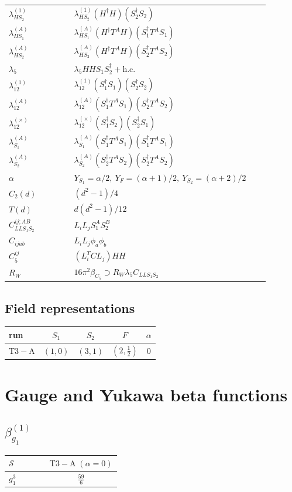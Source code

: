 \documentclass[9pt]{article}
\begin{document}
\begin{longtable}{@{}p{0.23\linewidth}p{0.69\linewidth}@{}}
$\lambda_{HS_2}^{(1)}$ & $\lambda_{HS_2}^{(1)}(H^\dagger H)(S_2^\dagger S_2)$ \\
$\lambda_{HS_1}^{(A)}$ & $\lambda_{HS_1}^{(A)}(H^\dagger T^AH)(S_1^\dagger T^AS_1)$ \\
$\lambda_{HS_2}^{(A)}$ & $\lambda_{HS_2}^{(A)}(H^\dagger T^AH)(S_2^\dagger T^AS_2)$ \\
$\lambda_5$ & $\lambda_5HHS_1S_2^\dagger+\mathrm{h.c.}$ \\
$\lambda_{12}^{(1)}$ & $\lambda_{12}^{(1)}(S_1^\dagger S_1)(S_2^\dagger S_2)$ \\
$\lambda_{12}^{(A)}$ & $\lambda_{12}^{(A)}(S_1^\dagger T^AS_1)(S_2^\dagger T^AS_2)$ \\
$\lambda_{12}^{(\times)}$ & $\lambda_{12}^{(\times)}(S_1^\dagger S_2)(S_2^\dagger S_1)$ \\
$\lambda_{S_1}^{(A)}$ & $\lambda_{S_1}^{(A)}(S_1^\dagger T^A S_1)(S_1^\dagger T^A S_1)$ \\
$\lambda_{S_2}^{(A)}$ & $\lambda_{S_2}^{(A)}(S_2^\dagger T^A S_2)(S_2^\dagger T^A S_2)$ \\
$\alpha$ & $Y_{S_1}=\alpha/2,\ Y_F=(\alpha+1)/2,\ Y_{S_2}=(\alpha+2)/2$ \\
$C_2(d)$ & $(d^2-1)/4$ \\
$T(d)$ & $d(d^2-1)/12$ \\
$C_{LLS_1S_2}^{ij;AB}$ & $L_iL_jS_1^AS_2^B$ \\
$C_{ijab}$ & $L_iL_j\phi_a\phi_b$ \\
$C_5^{ij}$ & $(L_i^TCL_j)HH$ \\
$R_W$ & $16\pi^2\beta_{C_5}\supset R_W\lambda_5C_{LLS_1S_2}$ \\
\bottomrule
\end{longtable}
\subsection*{Field representations}
\begin{longtable}{@{}lcccc@{}}
\toprule
run & $S_1$ & $S_2$ & $F$ & $\alpha$ \\
\midrule
$\mathrm{T3-A}$ & $(1,0)$ & $(3,1)$ & $(2,\frac{1}{2})$ & $0$ \\
\bottomrule
\end{longtable}
\section*{Gauge and Yukawa beta functions}
\subsection*{$ \beta_{g_1}^{(1)} $}
\begin{longtable}{@{}p{0.38\linewidth}c@{}}
\toprule
$\mathcal{S}$ & $ \mathrm{T3-A}\;(\alpha=0) $ \\
\midrule
$ g_1^3 $ & $ \frac{59}{6} $ \\
\bottomrule
\end{longtable}
\end{document}
